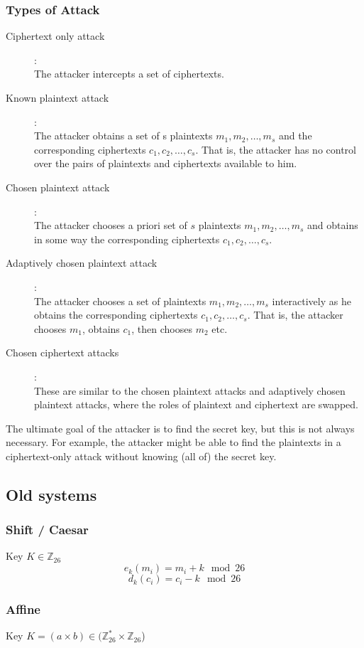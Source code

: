 \subsubsection{Types of Attack}

\begin{description}
\item[Ciphertext only attack]:\\
  The attacker intercepts a set of ciphertexts.
\item[Known plaintext attack]:\\
  The attacker obtains a set of s plaintexts $m_1 , m_2 , \ldots, m_s$
  and the corresponding ciphertexts $c_1 , c_2 , \ldots, c_s$. That
  is, the attacker has no control over the pairs of plaintexts and
  ciphertexts available to him.
\item[Chosen plaintext attack]:\\
  The attacker chooses a priori set of $s$ plaintexts $m_1 , m_2 ,
  \ldots, m_s$ and obtains in some way the corresponding ciphertexts
  $c_1 , c_2 , \ldots, c_s$.
\item[Adaptively chosen plaintext attack]:\\
  The attacker chooses a set of plaintexts $m_1 , m_2 , \ldots, m_s$
  interactively as he obtains the corresponding ciphertexts $c_1 , c_2
  , \ldots, c_s$. That is, the attacker chooses $m_1$, obtains $c_1$,
  then chooses $m_2$ etc.
\item[Chosen ciphertext attacks]:\\
  These are similar to the chosen plaintext attacks and adaptively
  chosen plaintext attacks, where the roles of plaintext and
  ciphertext are swapped.
\end{description}

The ultimate goal of the attacker is to find the secret key, but this
is not always necessary. For example, the attacker might be able to
find the plaintexts in a ciphertext-only attack without knowing (all
of) the secret key.

\subsection{Old systems}
\subsubsection{Shift / Caesar}
Key $K \in \mathbb{Z}_{26}$
\[ e_k(m_i) =  m_i + k \mod 26 \]
\[ d_k(c_i) = c_i - k \mod 26 \]

\subsubsection{Affine}
Key $K = (a \times b) \in (\mathbb{Z}_{26}^* \times \mathbb{Z}_{26}$)

